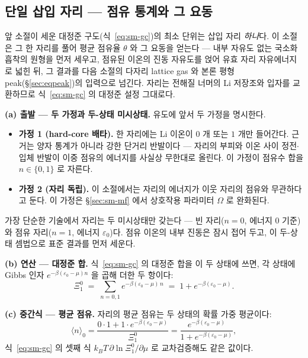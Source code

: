 \subsection{단일 삽입 자리 --- 점유 통계와 그 요동}\label{sec:sm-site}
앞 소절이 세운 대정준 구도(식~\eqref{eq:sm-gc})의 최소 단위는 삽입 자리 \emph{하나}다. 이 소절은 그 한
자리를 풀어 평균 점유율 $\theta$ 와 그 요동을 얻는다 --- 내부 자유도 없는 국소화 흡착의 원형을 먼저 세우고,
점유된 이온의 진동 자유도를 얹어 유효 자리 자유에너지로 넓힌 뒤, 그 결과를 다음 소절의 다자리
lattice gas 와 본론 평형 peak(\S\ref{sec:eqpeak})의 입력으로 넘긴다. 자리는 전해질 너머의 Li 저장조와
입자를 교환하므로 식~\eqref{eq:sm-gc} 의 대정준 설정 그대로다.

\textbf{(a) 출발 --- 두 가정과 두-상태 미시상태.} 유도에 앞서 두 가정을 명시한다.
\begin{itemize}[leftmargin=2.2em,itemsep=0.1em]
\item \textbf{가정 1 (hard-core 배타).} 한 자리에는 Li 이온이 $0$ 개 또는 $1$ 개만 들어간다. 근거는 양자
통계가 아니라 강한 단거리 반발이다 --- 자리의 부피와 이온 사이 정전$\cdot$입체 반발이 이중 점유의
에너지를 사실상 무한대로 올린다. 이 가정이 점유수 합을 $n\in\{0,1\}$ 로 자른다.
\item \textbf{가정 2 (자리 독립).} 이 소절에서는 자리의 에너지가 이웃 자리의 점유와 무관하다고 둔다.
이 가정은 \S\ref{sec:sm-mf} 에서 상호작용 파라미터 $\Omega$ 로 완화된다.
\end{itemize}
가장 단순한 기술에서 자리는 두 미시상태만 갖는다 --- 빈 자리($n=0$, 에너지 $0$ 기준)와 점유
자리($n=1$, 에너지 $\varepsilon_0$)다. 점유 이온의 내부 진동은 잠시 접어 두고, 이 두-상태 셈법으로
표준 결과를 먼저 세운다.

\textbf{(b) 연산 --- 대정준 합.} 식~\eqref{eq:sm-gc} 의 대정준 합을 이 두 상태에 쓰면, 각 상태에 Gibbs
인자 $e^{-\beta(\varepsilon_0-\mu)n}$ 을 곱해 더한 두 항이다:
\begin{equation}
\Xi_1^0\;=\;\sum_{n=0,1}e^{-\beta(\varepsilon_0-\mu)\,n}\;=\;1+e^{-\beta(\varepsilon_0-\mu)}.
\label{eq:sm-bareXi}
\end{equation}

\textbf{(c) 중간식 --- 평균 점유.} 자리의 평균 점유는 두 상태의 확률 가중 평균이다:
\begin{equation}
\langle n\rangle_0=\frac{0\cdot1+1\cdot e^{-\beta(\varepsilon_0-\mu)}}{\Xi_1^0}
=\frac{e^{-\beta(\varepsilon_0-\mu)}}{1+e^{-\beta(\varepsilon_0-\mu)}},
\label{eq:sm-baremid}
\end{equation}
식~\eqref{eq:sm-gc} 의 셋째 식 $k_BT\,\partial\ln\Xi_1^0/\partial\mu$ 로 교차검증해도 같은 값이다.

